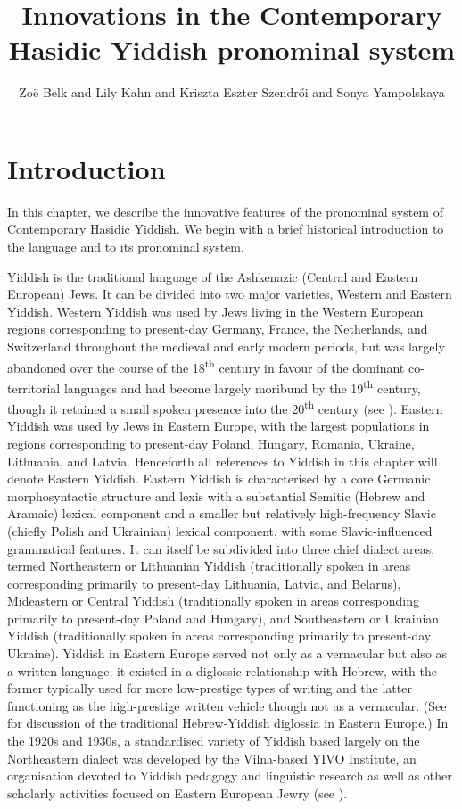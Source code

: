 \documentclass[output=paper, hidelinks]{langscibook}
\author{Zoë Belk\affiliation{Department of Linguistics, University College London} and Lily Kahn\affiliation{Department of Hebrew and Jewish Studies, University College London} and Kriszta Eszter Szendr\H{o}i\affiliation{Department of Linguistics, University of Vienna} and Sonya Yampolskaya\affiliation{Department of Hebrew and Jewish Studies, University College London}}
\title{Innovations in the Contemporary Hasidic Yiddish pronominal system}
\begin{document}
\maketitle

\section{Introduction}\label{sec:introduction}

In this chapter, we describe the innovative features of the pronominal system of Contemporary Hasidic Yiddish. We begin with a brief historical introduction to the language and to its pronominal system.

Yiddish is the traditional language of the Ashkenazic (Central and Eastern European) Jews. It can be divided into two major varieties, Western and Eastern Yiddish. Western Yiddish was used by Jews living in the Western European regions corresponding to present-day Germany, France, the Netherlands, and Switzerland throughout the medieval and early modern periods, but was largely abandoned over the course of the 18\textsuperscript{th} century in favour of the dominant co-territorial languages and had become largely moribund by the 19\textsuperscript{th} century, though it retained a small spoken presence into the 20\textsuperscript{th} century (see \citealt{Fleischer18}). Eastern Yiddish was used by Jews in Eastern Europe, with the largest populations in regions corresponding to present-day Poland, Hungary, Romania, Ukraine, Lithuania, and Latvia. Henceforth all references to Yiddish in this chapter will denote Eastern Yiddish. Eastern Yiddish is characterised by a core Germanic morphosyntactic structure and lexis with a substantial Semitic (Hebrew and Aramaic) lexical component and a smaller but relatively high-frequency Slavic (chiefly Polish and Ukrainian) lexical component, with some Slavic-influenced grammatical features. It can itself be subdivided into three chief dialect areas, termed Northeastern or Lithuanian Yiddish (traditionally spoken in areas corresponding primarily to present-day Lithuania, Latvia, and Belarus), Mideastern or Central Yiddish (traditionally spoken in areas corresponding primarily to present-day Poland and Hungary), and Southeastern or Ukrainian Yiddish (traditionally spoken in areas corresponding primarily to present-day Ukraine). Yiddish in Eastern Europe served not only as a vernacular but also as a written language; it existed in a diglossic relationship with Hebrew, with the former typically used for more low-prestige types of writing and the latter functioning as the high-prestige written vehicle though not as a vernacular. (See \citealt{Harshav90} for discussion of the traditional Hebrew-Yiddish diglossia in Eastern Europe.) In the 1920s and 1930s, a standardised variety of Yiddish based largely on the Northeastern dialect was developed by the Vilna-based YIVO Institute, an organisation devoted to Yiddish pedagogy and linguistic research as well as other scholarly activities focused on Eastern European Jewry (see \citealt{Kuznitz10}).
\end{document}
